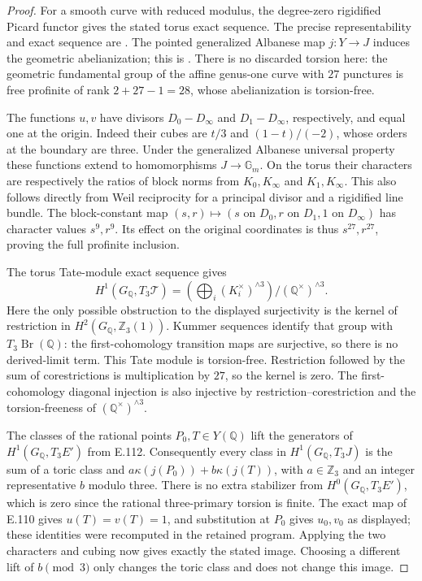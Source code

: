 \begin{proof}
For a smooth curve with reduced modulus, the degree-zero rigidified
Picard functor gives the stated torus exact sequence. The precise
representability and exact sequence are
\citet[Proposition 1.6, (1.4.1), p.~954]{AuditJordanRibetScholl}.
The pointed generalized Albanese map $j:Y\to J$ induces the
geometric abelianization; this is
\citet[Proposition A.8(iii), pp.~232--234]{AuditMochizuki2012}.
There is no discarded torsion here: the geometric fundamental group
of the affine genus-one curve with $27$ punctures is free profinite
of rank $2+27-1=28$, whose abelianization is torsion-free.

The functions $u,v$ have divisors $D_0-D_\infty$ and $D_1-D_\infty$,
respectively, and equal one at the origin. Indeed their cubes are
$t/3$ and $(1-t)/(-2)$, whose orders at the boundary are three.
Under the generalized Albanese universal property these functions
extend to homomorphisms $J\to\mathbb G_m$. On the torus their
characters are respectively the ratios of block norms from
$K_0,K_\infty$ and $K_1,K_\infty$. This also follows directly from
Weil reciprocity for a principal divisor and a rigidified line bundle.
The block-constant map $(s,r)\mapsto(s\text{ on }D_0,
r\text{ on }D_1,1\text{ on }D_\infty)$ has character values
$s^9,r^9$. Its effect on the original coordinates is thus
$s^{27},r^{27}$, proving the full profinite inclusion.

The torus Tate-module exact sequence gives
\[
 H^1(G_{\mathbb Q},T_3\mathcal T)
   =\left(\bigoplus_i(K_i^\times)^{\wedge3}\right)
        /(\mathbb Q^\times)^{\wedge3}.
\]
Here the only possible obstruction to the displayed surjectivity is
the kernel of restriction in $H^2(G_{\mathbb Q},\mathbb Z_3(1))$.
Kummer sequences identify that group with $T_3\operatorname{Br}(\mathbb Q)$:
the first-cohomology transition maps are surjective, so there is no
derived-limit term. This Tate module is torsion-free. Restriction
followed by the sum of corestrictions is multiplication by $27$,
so the kernel is zero. The first-cohomology diagonal injection is
also injective by restriction--corestriction and the torsion-freeness
of $(\mathbb Q^\times)^{\wedge3}$.

The classes of the rational points $P_0,T\in Y(\mathbb Q)$ lift
the generators of $H^1(G_{\mathbb Q},T_3E')$ from E.112.
Consequently every class in $H^1(G_{\mathbb Q},T_3J)$ is the sum
of a toric class and $a\kappa(j(P_0))+b\kappa(j(T))$, with
$a\in\mathbb Z_3$ and an integer representative $b$ modulo three.
There is no extra stabilizer from $H^0(G_{\mathbb Q},T_3E')$, which
is zero since the rational three-primary torsion is finite.
The exact map of E.110 gives $u(T)=v(T)=1$, and substitution at
$P_0$ gives $u_0,v_0$ as displayed; these identities were recomputed
in the retained program. Applying the two characters and cubing
now gives exactly the stated image. Choosing a different lift of
$b\pmod3$ only changes the toric class and does not change this image.


\end{proof}
